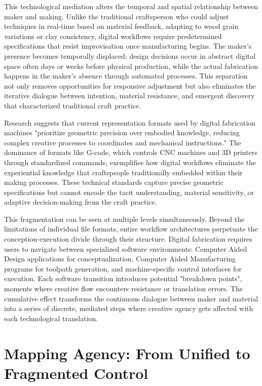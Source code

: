 This technological mediation alters the temporal and spatial relationship between maker and making. Unlike the traditional craftsperson who could adjust techniques in real-time based on material feedback, adapting to wood grain variations or clay consistency, digital workflows require predetermined specifications that resist improvisation once manufacturing begins. The maker's presence becomes temporally displaced: design decisions occur in abstract digital space often days or weeks before physical production, while the actual fabrication happens in the maker's absence through automated processes. This separation not only removes opportunities for responsive adjustment but also eliminates the iterative dialogue between intention, material resistance, and emergent discovery that characterized traditional craft practice.

Research suggests that current representation formats used by digital fabrication machines "prioritize geometric precision over embodied knowledge, reducing complex creative processes to coordinates and mechanical instructions." The dominance of formats like G-code, which controls CNC machines and 3D printers through standardized commands, exemplifies how digital workflows eliminate the experiential knowledge that craftspeople traditionally embedded within their making processes. These technical standards capture precise geometric specifications but cannot encode the tacit understanding, material sensitivity, or adaptive decision-making from the craft practice.

This fragmentation can be seen at multiple levels simultaneously. Beyond the limitations of individual file formats, entire workflow architectures perpetuate the conception-execution divide through their structure. Digital fabrication requires users to navigate between specialized software environments: Computer Aided Design applications for conceptualization, Computer Aided Manufacturing programs for toolpath generation, and machine-specific control interfaces for execution. Each software transition introduces potential "breakdown points", moments where creative flow encounters resistance or translation errors. The cumulative effect transforms the continuous dialogue between maker and material into a series of discrete, mediated steps where creative agency gets affected with each technological translation.

\section{Mapping Agency: From Unified to Fragmented Control}


